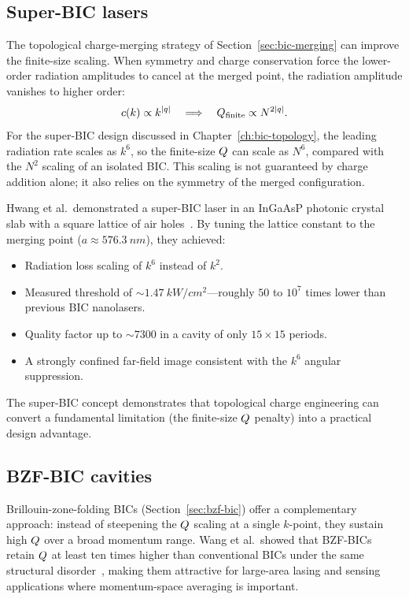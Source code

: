 \subsection{Super-BIC lasers}
\label{ssec:super-bic-device}

The topological charge-merging strategy of Section~\ref{sec:bic-merging}
can improve the finite-size scaling. When symmetry and
charge conservation force the lower-order radiation amplitudes to cancel
at the merged point, the radiation amplitude vanishes to higher order:
\begin{equation}
 c(k) \propto k^{|q|} \quad \Longrightarrow \quad
 Q_{\mathrm{finite}} \propto N^{2|q|}.
 \label{eq:super-bic-scaling}
\end{equation}
For the super-BIC design discussed in Chapter~\ref{ch:bic-topology}, the
leading radiation rate scales as $k^6$, so the finite-size $Q$ can
scale as $N^6$, compared with the $N^2$ scaling of an
isolated BIC. This scaling is not guaranteed by charge addition alone;
it also relies on the symmetry of the merged configuration.

Hwang et al.\ demonstrated a super-BIC laser in an InGaAsP photonic
crystal slab with a square lattice of air holes~\cite{hwang2021ultralow}.
By tuning the lattice constant to the merging point
($a \approx \SI{576.3}{nm}$), they achieved:
\begin{itemize}
 \item Radiation loss scaling of $k^6$ instead of $k^2$.
 \item Measured threshold of $\sim\SI{1.47}{kW/cm^2}$---roughly
 $50$ to $10^7$ times lower than previous BIC nanolasers.
 \item Quality factor up to $\sim 7300$ in a cavity of only
 $15 \times 15$ periods.
 \item A strongly confined far-field image consistent with the $k^6$
 angular suppression.
\end{itemize}
The super-BIC concept demonstrates that topological charge engineering
can convert a fundamental limitation (the finite-size $Q$ penalty)
into a practical design advantage.

\subsection{BZF-BIC cavities}
\label{ssec:bzf-device}

Brillouin-zone-folding BICs (Section~\ref{sec:bzf-bic}) offer a
complementary approach: instead of steepening the $Q$ scaling at a
single $k$-point, they sustain high $Q$ over a broad momentum
range. Wang et al.\ showed that BZF-BICs retain $Q$ at least ten
times higher than conventional BICs under the same structural
disorder~\cite{wang2023brillouin}, making them attractive for large-area
lasing and sensing applications where momentum-space averaging is
important.

